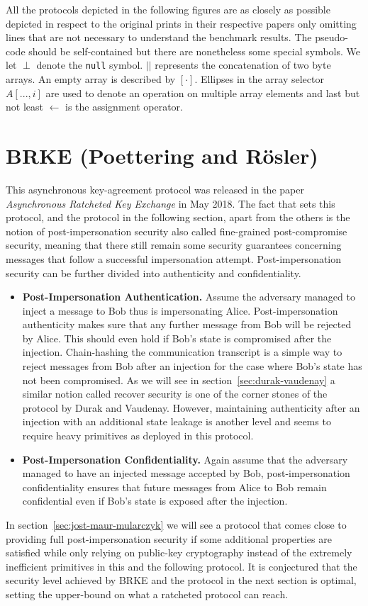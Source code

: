 \documentclass[11pt,a4paper,twoside,openright,bibliography=totoc]{scrbook}
\begin{document}
All the protocols depicted in the following figures are as closely
as possible depicted in respect to the original prints in their respective
papers only omitting lines that are not necessary
to understand the benchmark results. The pseudo-code should be self-contained
but there are nonetheless
some special symbols. We let $\perp$ denote the \texttt{null} symbol.
$||$ represents the concatenation of two byte arrays. An empty
array is described by $[\cdot]$. Ellipses in the array selector
$A[...,i]$ are used to
denote an operation on multiple array elements and last but not least
$\leftarrow$ is the assignment operator.

\section[BARK (Poettering and Rösler)]
{BRKE (Poettering and Rösler)~\cite{poettering2018towards}}
\label{sec:poettering-roesler}

This asynchronous key-agreement protocol was released in the paper
\textit{Asynchronous Ratcheted Key Exchange} in May 2018.
The fact that sets this protocol, and the protocol in the following
section, apart from the others is the notion of post-impersonation security
also called fine-grained post-compromise security,
meaning that there still remain some security guarantees concerning
messages that follow a successful
impersonation attempt. Post-impersonation security can be further divided
into authenticity and confidentiality.
\begin{itemize}
\item \textbf{Post-Impersonation Authentication.} Assume the adversary
  managed to inject a message to Bob thus is impersonating Alice.
  Post-impersonation authenticity makes sure that any further message
  from Bob will be rejected by Alice. This should even hold if
  Bob's state is compromised after the injection. Chain-hashing
  the communication transcript is a simple way to reject messages from
  Bob after an injection for the case where Bob's state has not
  been compromised. As we will see in section~\ref{sec:durak-vaudenay}
  a similar notion called recover security is one of the corner stones
  of the protocol by Durak and Vaudenay. However, maintaining authenticity
  after an injection with an additional state leakage is another level
  and seems to require heavy primitives as deployed in this protocol.
\item \textbf{Post-Impersonation Confidentiality.} Again assume
  that the adversary managed to have an injected message accepted by Bob,
  post-impersonation confidentiality ensures that future messages from
  Alice to Bob remain
  confidential even if Bob's state is exposed after the injection.
\end{itemize}
In section~\ref{sec:jost-maur-mularczyk} we will see a protocol
that comes close to providing full post-impersonation security
if some additional properties are satisfied while only relying on
public-key cryptography instead of the extremely inefficient
primitives in this and the following protocol. It is conjectured
that the security level achieved by BRKE and the protocol
in the next section is optimal, setting the upper-bound
on what a ratcheted protocol can reach.
\end{document}

